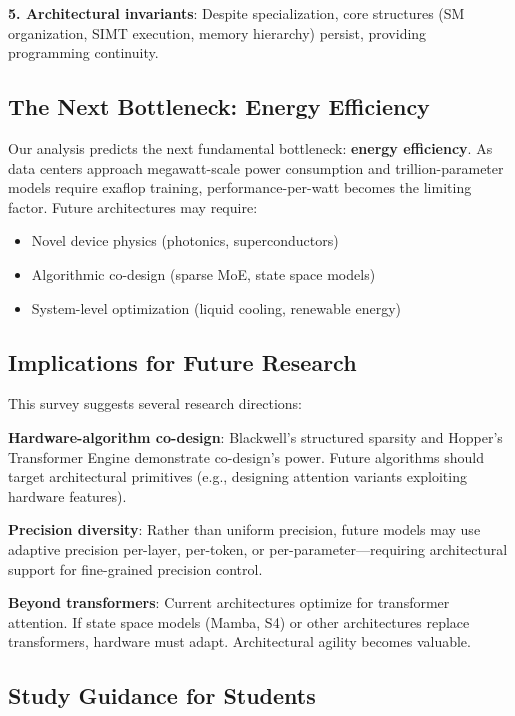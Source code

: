 \documentclass{article}
\begin{document}
\textbf{5. Architectural invariants}: Despite specialization, core structures (SM organization, SIMT execution, memory hierarchy) persist, providing programming continuity.

\subsection{The Next Bottleneck: Energy Efficiency}

Our analysis predicts the next fundamental bottleneck: \textbf{energy efficiency}. As data centers approach megawatt-scale power consumption and trillion-parameter models require exaflop training, performance-per-watt becomes the limiting factor. Future architectures may require:
\begin{itemize}
\item Novel device physics (photonics, superconductors)
\item Algorithmic co-design (sparse MoE, state space models)
\item System-level optimization (liquid cooling, renewable energy)
\end{itemize}

\subsection{Implications for Future Research}

This survey suggests several research directions:

\textbf{Hardware-algorithm co-design}: Blackwell's structured sparsity and Hopper's Transformer Engine demonstrate co-design's power. Future algorithms should target architectural primitives (e.g., designing attention variants exploiting hardware features).

\textbf{Precision diversity}: Rather than uniform precision, future models may use adaptive precision per-layer, per-token, or per-parameter—requiring architectural support for fine-grained precision control.

\textbf{Beyond transformers}: Current architectures optimize for transformer attention. If state space models (Mamba, S4) or other architectures replace transformers, hardware must adapt. Architectural agility becomes valuable.

\subsection{Study Guidance for Students}
\end{document}
